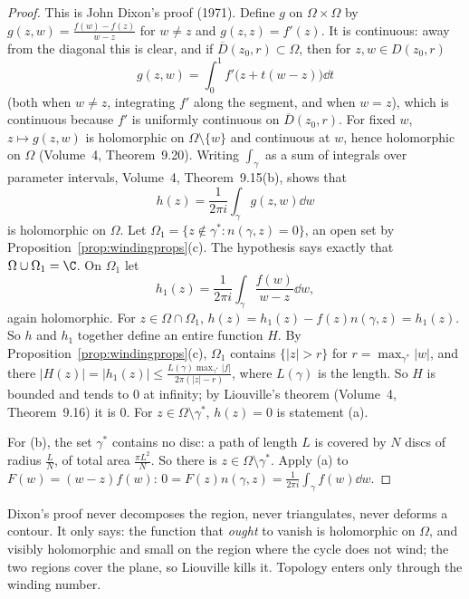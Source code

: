 \begin{proof}
This is John Dixon's proof (1971). Define $g$ on $\Omega\times\Omega$ by $g(z,w)=\frac{f(w)-f(z)}{w-z}$ for $w\ne z$ and $g(z,z)=f'(z)$. It is continuous: away from the diagonal this is clear, and if
$\overline D(z_0,r)\subset\Omega$, then for $z,w\in D(z_0,r)$
\[
g(z,w)=\int_0^1f'\bigl(z+t(w-z)\bigr)\dd t
\]
(both when $w\ne z$, integrating $f'$ along the segment, and when $w=z$), which is continuous because $f'$ is uniformly continuous on $\overline D(z_0,r)$. For fixed $w$, $z\mapsto g(z,w)$ is holomorphic on
$\Omega\setminus\{w\}$ and continuous at $w$, hence holomorphic on $\Omega$ (Volume~4, Theorem~9.20). Writing $\int_\gamma$ as a sum of integrals over parameter intervals, Volume~4, Theorem~9.15(b), shows that
\[
h(z)=\frac1{2\pi i}\int_\gamma g(z,w)\dd w
\]
is holomorphic on $\Omega$. Let $\Omega_1=\{z\notin\gamma^*:n(\gamma,z)=0\}$, an open set by Proposition~\ref{prop:windingprops}(c). The hypothesis says exactly that $\Omega\cup\Omega_1=\C$. On $\Omega_1$ let
\[
h_1(z)=\frac1{2\pi i}\int_\gamma\frac{f(w)}{w-z}\dd w,
\]
again holomorphic. For $z\in\Omega\cap\Omega_1$, $h(z)=h_1(z)-f(z)n(\gamma,z)=h_1(z)$. So $h$ and $h_1$ together define an entire function $H$. By Proposition~\ref{prop:windingprops}(c), $\Omega_1$
contains $\{|z|>r\}$ for $r=\max_{\gamma^*}|w|$, and there $|H(z)|=|h_1(z)|\le\frac{L(\gamma)\max_{\gamma^*}|f|}{2\pi(|z|-r)}$, where $L(\gamma)$ is the length. So $H$ is bounded and tends to $0$ at infinity; by
Liouville's theorem (Volume~4, Theorem~9.16) it is $0$. For $z\in\Omega\setminus\gamma^*$, $h(z)=0$ is statement (a).

For (b), the set $\gamma^*$ contains no disc: a path of length $L$ is covered by $N$ discs of radius $\frac LN$, of total area $\frac{\pi L^2}N$. So there is $z\in\Omega\setminus\gamma^*$. Apply (a) to
$F(w)=(w-z)f(w)$: $0=F(z)n(\gamma,z)=\frac1{2\pi i}\int_\gamma f(w)\dd w$.
\end{proof}

\begin{beauty}
Dixon's proof never decomposes the region, never triangulates, never deforms a contour. It only says: the function that \emph{ought} to vanish is holomorphic on $\Omega$, and visibly holomorphic and
small on the region where the cycle does not wind; the two regions cover the plane, so Liouville kills it. Topology enters only through the winding number.
\end{beauty}

